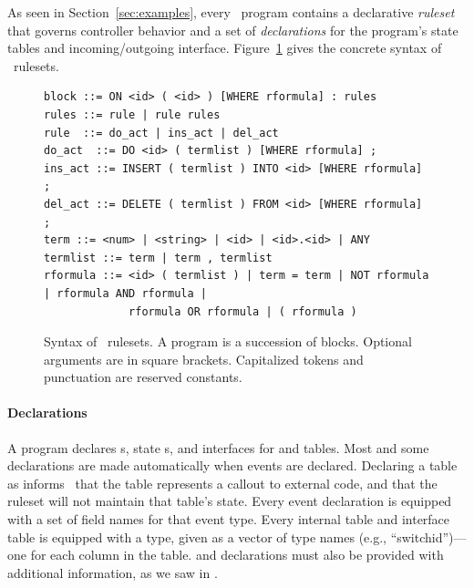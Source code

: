 As seen in Section~\ref{sec:examples}, every \flowlog\ program contains a
declarative \emph{ruleset} that governs controller behavior and a set of
\emph{declarations} for the program's state tables and incoming/outgoing interface.
Figure~\ref{fig:syntax} gives the concrete syntax of \flowlog\ rulesets.





\begin{figure}[t]
\footnotesize
\begin{verbatim}
block ::= ON <id> ( <id> ) [WHERE rformula] : rules
rules ::= rule | rule rules
rule  ::= do_act | ins_act | del_act
do_act  ::= DO <id> ( termlist ) [WHERE rformula] ;
ins_act ::= INSERT ( termlist ) INTO <id> [WHERE rformula] ;
del_act ::= DELETE ( termlist ) FROM <id> [WHERE rformula] ;
term ::= <num> | <string> | <id> | <id>.<id> | ANY
termlist ::= term | term , termlist
rformula ::= <id> ( termlist ) | term = term | NOT rformula | rformula AND rformula | 
             rformula OR rformula | ( rformula )   
\end{verbatim}
\normalsize
\caption{\small Syntax of \flowlog\ rulesets. A program is a succession of  blocks. Optional arguments are in square brackets. Capitalized tokens and punctuation are reserved constants.}
\label{fig:syntax}
\end{figure}

\paragraph{Declarations}

A program declares s, state s, and interfaces for
 and  tables.  Most  and some  
declarations are made automatically when events are declared. Declaring a table as
 informs \flowlog\ that the table represents a callout
to external code, and that the ruleset will not maintain that table's state. Every
event declaration is equipped with a set of field names for that event type.
Every internal table and interface table is equipped with a type, given as a vector
of type names (e.g., ``switchid'')---one for each column in the table.
 and  declarations must also be provided with
additional information, as we saw in .

